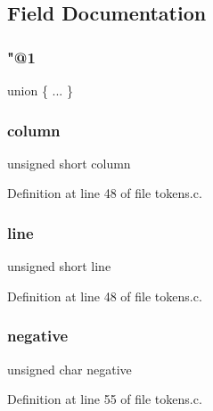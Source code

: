 \subsection{Field Documentation}
\mbox{\label{structtoken__info_a4b9d7d7970bf4f34c6e44b1e86218f27}} 
\subsubsection{\texorpdfstring{"@1}{@1}}
{\footnotesize\ttfamily union \{ ... \} }

\mbox{\label{structtoken__info_aa711ac8c1fc3d2cc6a64e13bda8993f4}} 
\subsubsection{\texorpdfstring{column}{column}}
{\footnotesize\ttfamily unsigned short column}



Definition at line 48 of file tokens.\+c.

\mbox{\label{structtoken__info_a12da61ba70beb7fda26fb3c1703b7b12}} 
\subsubsection{\texorpdfstring{line}{line}}
{\footnotesize\ttfamily unsigned short line}



Definition at line 48 of file tokens.\+c.

\mbox{\label{structtoken__info_aaf4c2889c4560c02792fa4cf4b0fe522}} 
\subsubsection{\texorpdfstring{negative}{negative}}
{\footnotesize\ttfamily unsigned char negative}



Definition at line 55 of file tokens.\+c.

